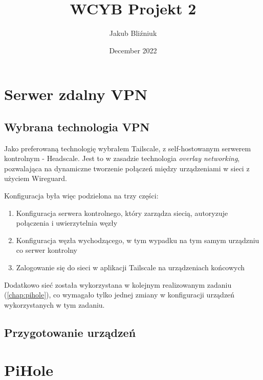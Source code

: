 \documentclass{report}
\title{WCYB Projekt 2}
\author{Jakub Bliźniuk}
\date{December 2022}
\numberwithin{equation}{section}
\begin{document}
\pagestyle{fancy}
\fancyfoot{}
\fancyfoot[C]{\thepage}

\begin{titlepage}
    \vfill
    \maketitle
    \thispagestyle{fancy}
\end{titlepage}
\tableofcontents
\thispagestyle{fancy}
\setcounter{chapter}{4}
\chapter{Serwer zdalny VPN}
\section{Wybrana technologia VPN}
Jako preferowaną technologię wybrałem Tailscale, z self-hostowanym serwerem kontrolnym - Headscale. Jest to w zasadzie technologia \textit{overlay networking}, pozwalająca na dynamiczne tworzenie połączeń między urządzeniami w sieci z użyciem Wireguard.

Konfiguracja była więc podzielona na trzy części:
\begin{enumerate}
    \item Konfiguracja serwera kontrolnego, który zarządza siecią, autoryzuje połączenia i uwierzytelnia węzły
    \item Konfiguracja węzła wychodzącego, w tym wypadku na tym samym urządzniu co serwer kontrolny
    \item Zalogowanie się do sieci w aplikacji Tailscale na urządzeniach końcowych
\end{enumerate}

Dodatkowo sieć została wykorzystana w kolejnym realizowanym zadaniu (\autoref{chap:pihole}), co wymagało tylko jednej zmiany w konfiguracji urządzeń wykorzystanych w tym zadaniu.

\section{Przygotowanie urządzeń}


\chapter{PiHole}
\label{chap:pihole}
\end{document}
